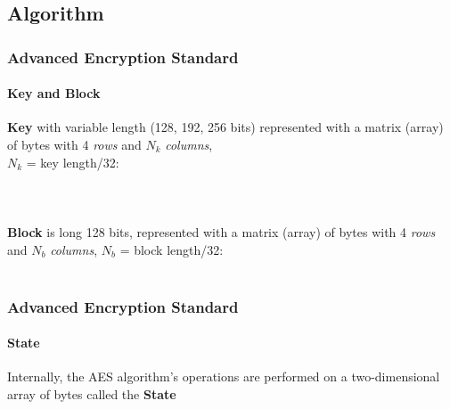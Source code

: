 \subsection{Algorithm}
\begin{frame}
	\frametitle{Advanced Encryption Standard}
		\framesubtitle{Key and Block}	
	{\normalsize
	{ \textbf{Key} with variable length (128, 192, 256 bits) represented with a matrix (array) of bytes with 4 \textit{rows}
	and $N_k$ \textit{columns},}\\ 
	{$N_k$ = key length/32:}\\
    \hspace{0.5cm}{– Key of 128 bits = 16 bytes, $N_k$ = 4}\\
    \hspace{0.5cm}{– Key of 192 bits = 24 bytes, $N_k$ = 6}\\
    \hspace{0.5cm}{– Key of 256 bits = 32 bytes, $N_k$ = 8}\\
	\vspace{0.2cm}
{\textbf{Block} is long 128 bits, represented with a matrix (array) of bytes with 4 \textit{rows} and $N_b$ \textit{columns}, $N_b$ = block length/32:}\\
	\hspace{0.5cm}{– Block of 128 bits = 16 bytes, $N_b$ = 4}\\	
	}
\end{frame}

\begin{frame}
	\frametitle{Advanced Encryption Standard}
		\framesubtitle{State}	
		{\normalsize Internally, the AES algorithm’s operations are performed on a two-dimensional array of bytes called the \textbf{State}  \\
		\hspace{0.5cm}{- Four rows, each containing $N_b$ bytes}\\
		\hspace{0.5cm}{- $N_b$ columns, constituted by 32-bit words}\\
		\\	
		\hspace{0.5cm}{- The array of bytes in input is copied in the State matrix}\\
		\hspace{0.5cm}{- At the end, the State matrix is copied in the output matrix}\\	
		}	
\end{frame}

